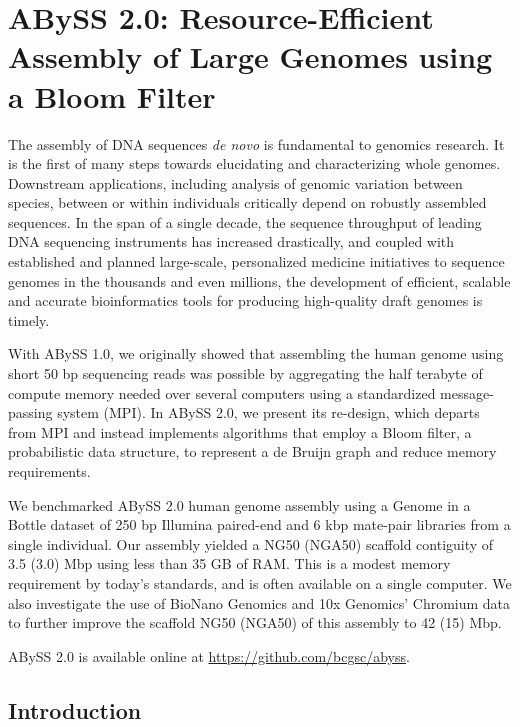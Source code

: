 \documentclass[
  12pt,
  oneside,
  openany]{book}
\begin{document}
\hypertarget{abyss-2.0-resource-efficient-assembly-of-large-genomes-using-a-bloom-filter}{%
\chapter{ABySS 2.0: Resource-Efficient Assembly of Large Genomes using a Bloom Filter}\label{abyss-2.0-resource-efficient-assembly-of-large-genomes-using-a-bloom-filter}}


The assembly of DNA sequences \emph{de novo} is fundamental to genomics research. It is the first of many steps towards elucidating and characterizing whole genomes. Downstream applications, including analysis of genomic variation between species, between or within individuals critically depend on robustly assembled sequences. In the span of a single decade, the sequence throughput of leading DNA sequencing instruments has increased drastically, and coupled with established and planned large-scale, personalized medicine initiatives to sequence genomes in the thousands and even millions, the development of efficient, scalable and accurate bioinformatics tools for producing high-quality draft genomes is timely.

With ABySS 1.0, we originally showed that assembling the human genome using short 50 bp sequencing reads was possible by aggregating the half terabyte of compute memory needed over several computers using a standardized message-passing system (MPI). In ABySS 2.0, we present its re-design, which departs from MPI and instead implements algorithms that employ a Bloom filter, a probabilistic data structure, to represent a de Bruijn graph and reduce memory requirements.

We benchmarked ABySS 2.0 human genome assembly using a Genome in a Bottle dataset of 250 bp Illumina paired-end and 6 kbp mate-pair libraries from a single individual. Our assembly yielded a NG50 (NGA50) scaffold contiguity of 3.5 (3.0) Mbp using less than 35 GB of RAM. This is a modest memory requirement by today's standards, and is often available on a single computer. We also investigate the use of BioNano Genomics and 10x Genomics' Chromium data to further improve the scaffold NG50 (NGA50) of this assembly to 42 (15) Mbp.

ABySS 2.0 is available online at \url{https://github.com/bcgsc/abyss}.

\hypertarget{introduction-1}{%
\section{Introduction}\label{introduction-1}}
\end{document}
